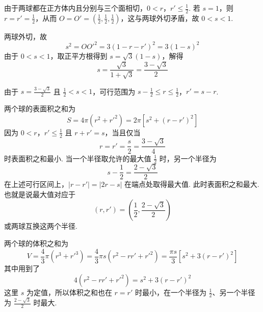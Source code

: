 \documentclass[UTF8,a4paper,oneside,11pt]{ctexbook}
\begin{document}
\begin{solution}
\begin{enumerate}
由于两球都在正方体内且分别与三个面相切，\(0<r\)，\(r'\le\frac12\). 若 \(s=1\)，则 \(r=r'=\frac12\)，从而 \(O=O'=\left(\frac12,\frac12,\frac12\right)\)，这与两球外切矛盾，故 \(0<s<1\).

两球外切，故
\[
s^2=OO'^2=3\left( 1-r-r' \right)^2=3\left( 1-s \right)^2
\]
由于 \(0<s<1\)，取正平方根得到 \(s=\sqrt3\left( 1-s \right)\)，解得
\[
s=\frac{\sqrt3}{1+\sqrt3}=\frac{3-\sqrt3}{2}
\]

由于 \(s=\frac{3-\sqrt3}{2}\) 且 \(\frac12<s<1\)，可行范围为
\(s-\frac12\le r\le\frac12\)，\(r'=s-r\).

两个球的表面积之和为
\[
S=4\pi\left( r^2+r'^2 \right)=2\pi\left[ s^2+\left( r-r' \right)^2 \right]
\]
因为 \(0<r\)，\(r'\le\frac12\) 且 \(r+r'=s\)，当且仅当
\[
r=r'=\frac{s}{2}=\frac{3-\sqrt3}{4}
\]
时表面积之和最小. 当一个半径取允许的最大值 \(\frac12\) 时，另一个半径为
\[
s-\frac12=\frac{2-\sqrt3}{2}
\]
在上述可行区间上，\(\lvert r-r'\rvert=\lvert 2r-s\rvert\) 在端点处取得最大值. 此时表面积之和最大. 也就是说最大值对应于
\[
\left( r,r' \right)=\left( \frac12,\frac{2-\sqrt3}{2} \right)
\]
或两球互换这两个半径.

两个球的体积之和为
\[
V=\frac43\pi\left( r^3+r'^3 \right)
=\frac43\pi s\left( r^2-rr'+r'^2 \right)
=\frac{\pi s}{3}\left[ s^2+3\left( r-r' \right)^2 \right]
\]
其中用到了
\[
4\left( r^2-rr'+r'^2 \right)=s^2+3\left( r-r' \right)^2
\]
这里 \(s\) 为定值，所以体积之和也在 \(r=r'\) 时最小，在一个半径为 \(\frac12\)、另一个半径为 \(\frac{2-\sqrt3}{2}\) 时最大.
\end{enumerate}
\end{solution}

\end{document}
